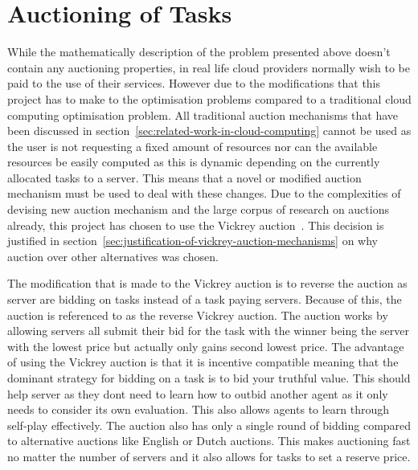 
\section{Auctioning of Tasks}\label{sec:auctioning-of-tasks}
While the mathematically description of the problem presented above doesn't contain any auctioning properties, in real
life cloud providers normally wish to be paid to the use of their services. However due to the modifications that
this project has to make to the optimisation problems compared to a traditional cloud computing optimisation problem.
All traditional auction mechanisms that have been discussed in section~\ref{sec:related-work-in-cloud-computing} cannot
be used as the user is not requesting a fixed amount of resources nor can the available resources be easily computed
as this is dynamic depending on the currently allocated tasks to a server. This means that a novel or modified auction
mechanism must be used to deal with these changes. Due to the complexities of devising new auction mechanism and the
large corpus of research on auctions already, this project has chosen to use the Vickrey auction~\citep{vickrey}.
This decision is justified in section~\ref{sec:justification-of-vickrey-auction-mechanisms} on why auction over other
alternatives was chosen.

The modification that is made to the Vickrey auction is to reverse the auction as server are bidding on tasks instead of
a task paying servers. Because of this, the auction is referenced to as the reverse Vickrey auction. The auction works
by allowing servers all submit their bid for the task with the winner being the server with the lowest
price but actually only gains second lowest price. The advantage of using the Vickrey auction is that it is  incentive
compatible meaning that the dominant strategy for bidding on a task is to bid your truthful value. This should help
server as they dont need to learn how to outbid another agent as it only needs to consider its own evaluation.
This also allows agents to learn through self-play effectively. The auction also has only a single round of bidding
compared to alternative auctions like English or Dutch auctions. This makes auctioning fast no matter the number of
servers and it also allows for tasks to set a reserve price.

